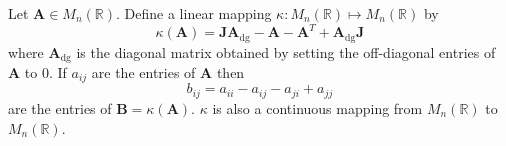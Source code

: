 \begin{definition}
  \label{def:12}
  Let $\mathbf{A} \in M_n(\mathbb{R})$. Define a linear mapping
  $\kappa \colon M_n(\mathbb{R}) \mapsto M_n(\mathbb{R})$ by
  \begin{equation}
    \label{eq:61}
    \kappa(\mathbf{A}) = \mathbf{J}\mathbf{A}_{\mathrm{dg}} -
    \mathbf{A} - \mathbf{A}^{T} + \mathbf{A}_{\mathrm{dg}}\mathbf{J}
  \end{equation}
  where $\mathbf{A}_{\mathrm{dg}}$ is the diagonal matrix obtained by
  setting the off-diagonal entries of $\mathbf{A}$ to $0$. If $a_{ij}$
  are the entries of $\mathbf{A}$ then
  \begin{equation}
    \label{eq:70}
    b_{ij} = a_{ii} - a_{ij} - a_{ji} + a_{jj}
  \end{equation}
  are the entries of $\mathbf{B} = \kappa(\mathbf{A})$. $\kappa$ is
  also a continuous mapping from $M_n(\mathbb{R})$ to
  $M_n(\mathbb{R})$. 
\end{definition}

